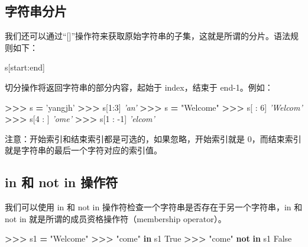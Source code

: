 \documentclass[]{ctexbook}
\newenvironment{Shaded}{\begin{snugshade}}{\end{snugshade}}
\newcommand{\CommentTok}[1]{\textcolor[rgb]{0.56,0.35,0.01}{\textit{#1}}}
\newcommand{\DecValTok}[1]{\textcolor[rgb]{0.00,0.00,0.81}{#1}}
\newcommand{\KeywordTok}[1]{\textcolor[rgb]{0.13,0.29,0.53}{\textbf{#1}}}
\newcommand{\NormalTok}[1]{#1}
\newcommand{\OperatorTok}[1]{\textcolor[rgb]{0.81,0.36,0.00}{\textbf{#1}}}
\newcommand{\StringTok}[1]{\textcolor[rgb]{0.31,0.60,0.02}{#1}}
\newcommand{\VariableTok}[1]{\textcolor[rgb]{0.00,0.00,0.00}{#1}}
\begin{document}
\hypertarget{ux5b57ux7b26ux4e32ux5206ux7247}{%
\subsection{字符串分片}\label{ux5b57ux7b26ux4e32ux5206ux7247}}

我们还可以通过``{[}{]}''操作符来获取原始字符串的子集，这就是所谓的分片。语法规则如下：

\begin{Shaded}
\begin{Highlighting}[]
\NormalTok{s[start:end]}
\end{Highlighting}
\end{Shaded}

切分操作将返回字符串的部分内容，起始于 index，结束于 end-1。例如：

\begin{Shaded}
\begin{Highlighting}[]
\OperatorTok{>>>}\NormalTok{ s }\OperatorTok{=} \StringTok{'yangjh'}
\OperatorTok{>>>}\NormalTok{ s[}\DecValTok{1}\NormalTok{:}\DecValTok{3}\NormalTok{]}
\CommentTok{'an'}
\OperatorTok{>>>}\NormalTok{ s }\OperatorTok{=} \StringTok{"Welcome"}
\OperatorTok{>>>}\NormalTok{ s[ : }\DecValTok{6}\NormalTok{]}
\CommentTok{'Welcom'}
\OperatorTok{>>>}\NormalTok{ s[}\DecValTok{4}\NormalTok{ : ]}
\CommentTok{'ome'}
\OperatorTok{>>>}\NormalTok{ s[}\DecValTok{1}\NormalTok{ : }\DecValTok{-1}\NormalTok{]}
\CommentTok{'elcom'}
\end{Highlighting}
\end{Shaded}

注意：开始索引和结束索引都是可选的，如果忽略，开始索引就是 0，而结束索引就是字符串的最后一个字符对应的索引值。

\hypertarget{in-ux548c-not-in-ux64cdux4f5cux7b26}{%
\subsection{in 和 not in 操作符}\label{in-ux548c-not-in-ux64cdux4f5cux7b26}}

我们可以使用 in 和 not in 操作符检查一个字符串是否存在于另一个字符串，in 和 not in 就是所谓的成员资格操作符（membership operator）。

\begin{Shaded}
\begin{Highlighting}[]
\OperatorTok{>>>}\NormalTok{ s1 }\OperatorTok{=} \StringTok{"Welcome"}
\OperatorTok{>>>} \StringTok{"come"} \KeywordTok{in}\NormalTok{ s1}
\VariableTok{True}
\OperatorTok{>>>} \StringTok{"come"} \KeywordTok{not} \KeywordTok{in}\NormalTok{ s1}
\VariableTok{False}
\end{Highlighting}
\end{Shaded}
\end{document}
